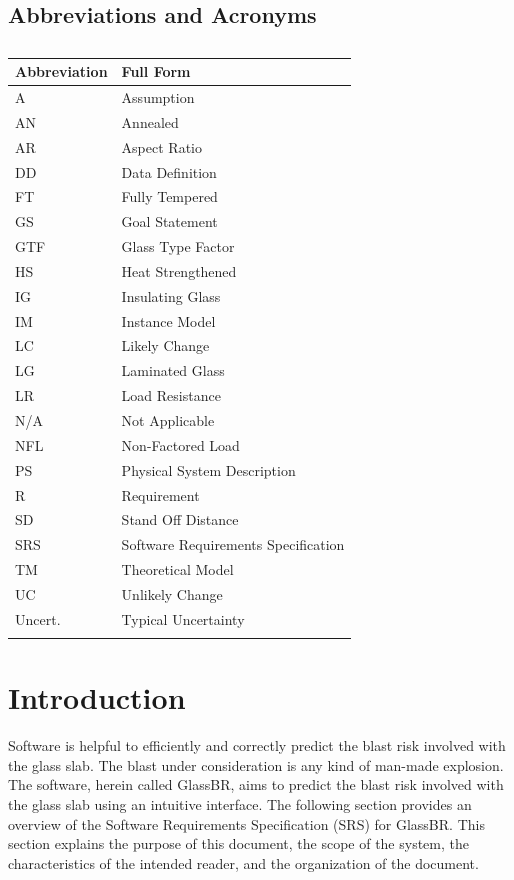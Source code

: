 \documentclass[12pt]{article}
\begin{document}
\subsection{Abbreviations and Acronyms}
\label{Sec:TAbbAcc}
\begin{longtable}{l l}
\toprule
\textbf{Abbreviation} & \textbf{Full Form}
\\
\midrule
\endhead
A & Assumption
\\
AN & Annealed
\\
AR & Aspect Ratio
\\
DD & Data Definition
\\
FT & Fully Tempered
\\
GS & Goal Statement
\\
GTF & Glass Type Factor
\\
HS & Heat Strengthened
\\
IG & Insulating Glass
\\
IM & Instance Model
\\
LC & Likely Change
\\
LG & Laminated Glass
\\
LR & Load Resistance
\\
N/A & Not Applicable
\\
NFL & Non-Factored Load
\\
PS & Physical System Description
\\
R & Requirement
\\
SD & Stand Off Distance
\\
SRS & Software Requirements Specification
\\
TM & Theoretical Model
\\
UC & Unlikely Change
\\
Uncert. & Typical Uncertainty
\\
\bottomrule
\caption{}
\label{Table:TAbbAcc}
\end{longtable}
\section{Introduction}
\label{Sec:Intro}
Software is helpful to efficiently and correctly predict the blast risk involved with the glass slab. The blast under consideration is any kind of man-made explosion. The software, herein called GlassBR, aims to predict the blast risk involved with the glass slab using an intuitive interface.
The following section provides an overview of the Software Requirements Specification (SRS) for GlassBR. This section explains the purpose of this document, the scope of the system, the characteristics of the intended reader, and the organization of the document.
\end{document}
